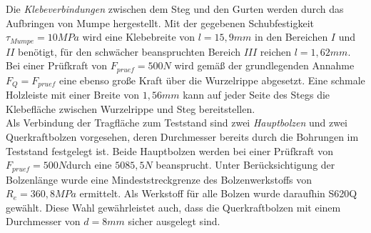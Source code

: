 \noindent Die \textit{Klebeverbindungen} zwischen dem Steg und den Gurten werden durch das Aufbringen von Mumpe hergestellt. Mit der gegebenen Schubfestigkeit $ \tau_{Mumpe}=10MPa $ wird eine Klebebreite von $ l=15,9mm $ in den Bereichen $ I $ und $ II $ benötigt, für den schwächer beanspruchten Bereich $ III $ reichen $ l=1,62mm $. Bei einer Prüfkraft von $ F_{pruef}=500N $ wird gemäß der grundlegenden Annahme $ F_{Q}=F_{pruef} $ eine ebenso große Kraft über die Wurzelrippe abgesetzt. Eine schmale Holzleiste mit einer Breite von $ 1,56mm $ kann auf jeder Seite des Stegs die Klebefläche zwischen Wurzelrippe und Steg bereitstellen.\\

\noindent Als Verbindung der Tragfläche zum Teststand sind zwei \textit{Hauptbolzen} und zwei Querkraftbolzen vorgesehen, deren Durchmesser bereits durch die Bohrungen im Teststand festgelegt ist. Beide Hauptbolzen werden bei einer Prüfkraft von $ F_{pruef}=500N $durch eine $ 5085,5N $ beansprucht. Unter Berücksichtigung der Bolzenlänge wurde eine Mindeststreckgrenze des Bolzenwerkstoffs von $ R_{e}=360,8MPa $ ermittelt. Als Werkstoff für alle Bolzen wurde daraufhin S620Q gewählt. Diese Wahl gewährleistet auch, dass die Querkraftbolzen mit einem Durchmesser von $ d=8mm $ sicher ausgelegt sind.\\

